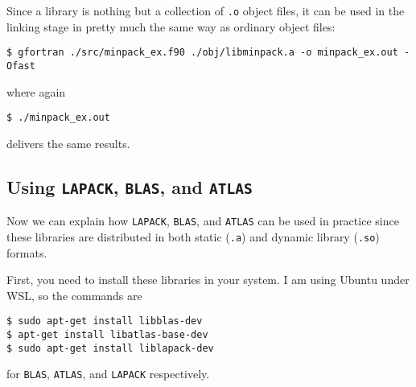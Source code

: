\documentclass[twoside,11pt,leqno]{article}
\newcommand{\code}{\texttt}
\begin{document}
Since a library is nothing but a collection of \code{.o} object files, it can be used in the linking stage in pretty much the same way as ordinary object files:
\begin{verbatim}
$ gfortran ./src/minpack_ex.f90 ./obj/libminpack.a -o minpack_ex.out -Ofast
\end{verbatim}
where again
\begin{verbatim}
$ ./minpack_ex.out
\end{verbatim}
delivers the same results.

\subsection{Using \code{LAPACK}, \code{BLAS}, and \code{ATLAS}}

Now we can explain how \code{LAPACK}, \code{BLAS}, and \code{ATLAS} can be used in practice since these libraries are distributed in both static (\code{.a}) and dynamic library (\code{.so}) formats.

First, you need to install these libraries in your system. I am using Ubuntu under WSL, so the commands are
\begin{verbatim}
$ sudo apt-get install libblas-dev
$ apt-get install libatlas-base-dev
$ sudo apt-get install liblapack-dev
\end{verbatim}
for \code{BLAS}, \code{ATLAS}, and \code{LAPACK} respectively.
\end{document}
